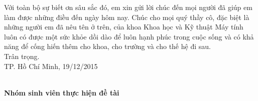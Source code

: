 Với toàn bộ sự biết ơn sâu sắc đó, em xin gửi lời chúc đến mọi người đã giúp em làm được những điều đến ngày hôm nay. Chúc cho mọi quý thầy cô, đặc biệt là những người em đã nêu tên ở trên, của khoa Khoa học và Kỹ thuật Máy tính luôn có được một sức khỏe dồi dào để luôn hạnh phúc trong cuộc sống và có khả năng để cống hiến thêm cho khoa, cho trường và cho thế hệ đi sau.\\

Trân trọng.\\

TP. Hồ Chí Minh, 19/12/2015\\\\

\hspace{5cm}
\begin{minipage}[t]{0.60\linewidth}
	\begin{center}
		\textbf{Nhóm sinh viên thực hiện đề tài}\\
	\end{center}
\end{minipage}
